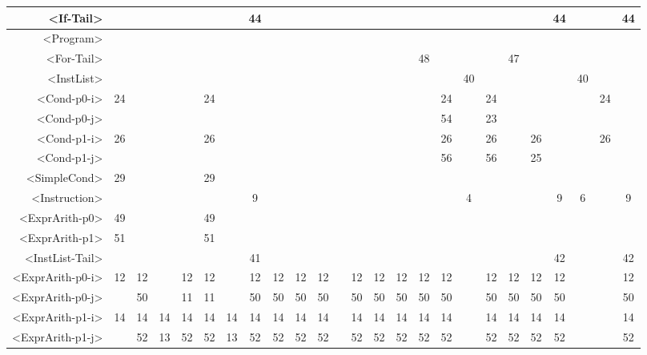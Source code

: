 \begin{tabular}{r|c@{ }c@{ }c@{ }c@{ }c@{ }c@{ }c@{ }c@{ }c@{ }c@{ }c@{ }c@{ }c@{ }c@{ }c@{ }c@{ }c@{ }c@{ }c@{ }c@{ }c@{ }c@{ }c@{ }c@{ }}
<If-Tail> &   &   &   &   &   &   & 44 &   &   &   &   &   &   &   &   &   &   &   &   &   & 44 &   &   & 44 \\\hline
<Program> &   &   &   &   &   &   &   &   &   &   &   &   &   &   &   &   &   &   &   &   &   &   &   &   \\\hline
<For-Tail> &   &   &   &   &   &   &   &   &   &   &   &   &   &   & 48 &   &   &   & 47 &   &   &   &   &   \\\hline
<InstList> &   &   &   &   &   &   &   &   &   &   &   &   &   &   &   &   & 40 &   &   &   &   & 40 &   &   \\\hline
<Cond-p0-i> & 24 &   &   &   & 24 &   &   &   &   &   &   &   &   &   &   & 24 &   & 24 &   &   &   &   & 24 &   \\\hline
<Cond-p0-j> &   &   &   &   &   &   &   &   &   &   &   &   &   &   &   & 54 &   & 23 &   &   &   &   &   &   \\\hline
<Cond-p1-i> & 26 &   &   &   & 26 &   &   &   &   &   &   &   &   &   &   & 26 &   & 26 &   & 26 &   &   & 26 &   \\\hline
<Cond-p1-j> &   &   &   &   &   &   &   &   &   &   &   &   &   &   &   & 56 &   & 56 &   & 25 &   &   &   &   \\\hline
<SimpleCond> & 29 &   &   &   & 29 &   &   &   &   &   &   &   &   &   &   &   &   &   &   &   &   &   &   &   \\\hline
<Instruction> &   &   &   &   &   &   & 9 &   &   &   &   &   &   &   &   &   & 4 &   &   &   & 9 & 6 &   & 9 \\\hline
<ExprArith-p0> & 49 &   &   &   & 49 &   &   &   &   &   &   &   &   &   &   &   &   &   &   &   &   &   &   &   \\\hline
<ExprArith-p1> & 51 &   &   &   & 51 &   &   &   &   &   &   &   &   &   &   &   &   &   &   &   &   &   &   &   \\\hline
<InstList-Tail> &   &   &   &   &   &   & 41 &   &   &   &   &   &   &   &   &   &   &   &   &   & 42 &   &   & 42 \\\hline
<ExprArith-p0-i> & 12 & 12 &   & 12 & 12 &   & 12 & 12 & 12 & 12 &   & 12 & 12 & 12 & 12 & 12 &   & 12 & 12 & 12 & 12 &   &   & 12 \\\hline
<ExprArith-p0-j> &   & 50 &   & 11 & 11 &   & 50 & 50 & 50 & 50 &   & 50 & 50 & 50 & 50 & 50 &   & 50 & 50 & 50 & 50 &   &   & 50 \\\hline
<ExprArith-p1-i> & 14 & 14 & 14 & 14 & 14 & 14 & 14 & 14 & 14 & 14 &   & 14 & 14 & 14 & 14 & 14 &   & 14 & 14 & 14 & 14 &   &   & 14 \\\hline
<ExprArith-p1-j> &   & 52 & 13 & 52 & 52 & 13 & 52 & 52 & 52 & 52 &   & 52 & 52 & 52 & 52 & 52 &   & 52 & 52 & 52 & 52 &   &   & 52 \\\hline
\end{tabular}


